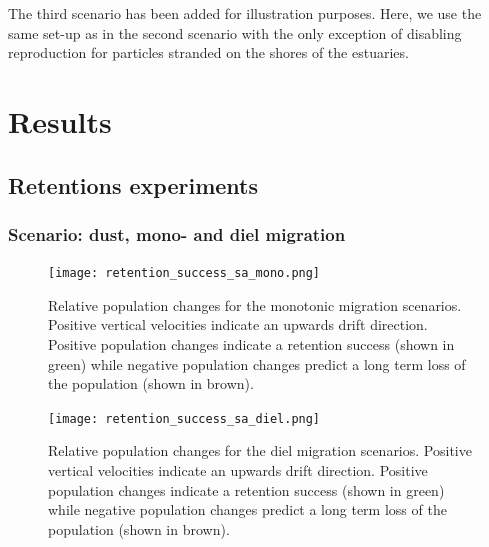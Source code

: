 The third scenario has been added for illustration purposes.
Here, we use the same set-up as in the second scenario with the only exception of disabling reproduction for particles stranded on the shores of the estuaries.




\section*{Results}

\subsection*{Retentions experiments}

\subsubsection*{Scenario: dust, mono- and diel migration}

\begin{figure}
    \texttt{[image: retention\_success\_sa\_mono.png]}
    \caption[]{Relative population changes for the monotonic migration scenarios. Positive vertical velocities indicate an upwards drift direction. Positive population changes indicate a retention success (shown in green) while negative population changes predict a long term loss of the population (shown in brown).}
    \label{fig:monotonic_retention_success}
\end{figure}
\begin{figure}
    \texttt{[image: retention\_success\_sa\_diel.png]}
    \caption[]{Relative population changes for the diel migration scenarios. Positive vertical velocities indicate an upwards drift direction. Positive population changes indicate a retention success (shown in green) while negative population changes predict a long term loss of the population (shown in brown).}
    \label{fig:diel_retention_success}
\end{figure}

